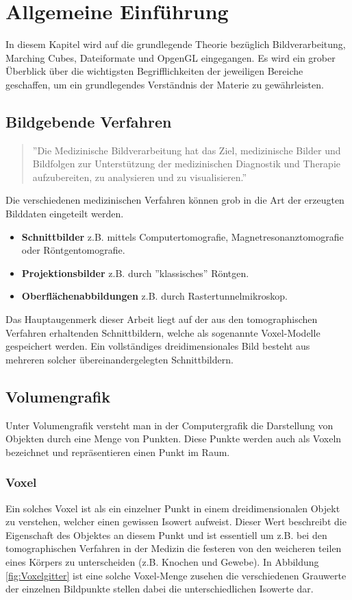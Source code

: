 \chapter{Allgemeine Einführung}
In diesem Kapitel wird auf die grundlegende Theorie bezüglich Bildverarbeitung, Marching Cubes, Dateiformate und OpgenGL eingegangen. Es wird ein grober Überblick über die wichtigsten Begrifflichkeiten der jeweiligen Bereiche geschaffen, um ein grundlegendes Verständnis der Materie zu gewährleisten.
\section{Bildgebende Verfahren}
\begin{quote}
	''Die Medizinische Bildverarbeitung hat das Ziel, medizinische Bilder und Bildfolgen zur Unterstützung der medizinischen Diagnostik und Therapie aufzubereiten, zu analysieren und zu visualisieren.'' \citep{MedBildVerarbeitung}\\
\end{quote}
Die verschiedenen medizinischen Verfahren können grob in die Art der erzeugten Bilddaten eingeteilt werden.
\begin{itemize}
	\item \textbf{Schnittbilder} z.B. mittels Computertomografie, Magnetresonanztomografie oder Röntgentomografie.
	\item \textbf{Projektionsbilder} z.B. durch ''klassisches'' Röntgen.
	\item \textbf{Oberflächenabbildungen} z.B. durch Rastertunnelmikroskop.\\
\end{itemize}
Das Hauptaugenmerk dieser Arbeit liegt auf der aus den tomographischen Verfahren erhaltenden Schnittbildern, welche als sogenannte Voxel-Modelle gespeichert werden. Ein vollständiges dreidimensionales Bild besteht aus mehreren solcher übereinandergelegten Schnittbildern.

\section{Volumengrafik}
Unter Volumengrafik versteht man in der Computergrafik die Darstellung von Objekten durch eine Menge von Punkten. Diese Punkte werden auch als Voxeln bezeichnet und repräsentieren einen Punkt im Raum.
\subsection{Voxel} 
Ein solches Voxel ist als ein einzelner Punkt in einem dreidimensionalen Objekt zu verstehen, welcher einen gewissen Isowert aufweist. Dieser Wert beschreibt die Eigenschaft des Objektes an diesem Punkt und ist essentiell um z.B. bei den tomographischen Verfahren in der Medizin die festeren von den weicheren teilen eines Körpers zu unterscheiden (z.B. Knochen und Gewebe). In Abbildung \ref{fig:Voxelgitter} ist eine solche Voxel-Menge zusehen die verschiedenen Grauwerte der einzelnen Bildpunkte stellen dabei die unterschiedlichen Isowerte dar.


